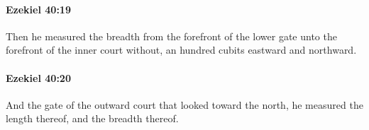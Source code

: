 		\paragraph{Ezekiel 40:19} %
			\label{EZEKIEL-40-19}

			Then he measured the breadth from the forefront of the lower gate unto the forefront of the inner court without, an hundred cubits eastward and northward.


		\paragraph{Ezekiel 40:20} %
			\label{EZEKIEL-40-20}

			And the gate of the outward court that looked toward the north, he measured the length thereof, and the breadth thereof.



